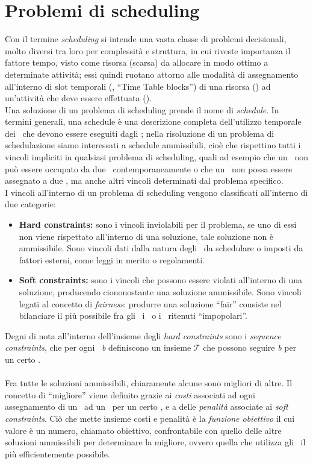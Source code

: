 \section{Problemi di scheduling}
Con il termine \textit{scheduling} si intende una vasta classe di problemi decisionali, molto diversi tra loro per
complessità e struttura, in cui riveste importanza il fattore
tempo, visto come risorsa (scarsa) da allocare in modo ottimo a determinate attività; essi quindi ruotano attorno alle modalità di assegnamento all'interno di slot temporali (\ttb, ``Time Table blocks'') di una risorsa (\task) ad un'attività che deve essere effettuata (\items). \\
Una soluzione di un problema di scheduling prende il nome di \textit{schedule}. In termini generali,
una schedule è una descrizione completa dell'utilizzo temporale dei \task\ che devono essere eseguiti dagli \items; nella risoluzione di un problema di schedulazione siamo interessati a schedule ammissibili, cioè che rispettino tutti i vincoli impliciti in qualsiasi problema di scheduling, quali ad esempio che un \task\ non può essere occupato da due \items\ contemporaneamente o che un \items\ non possa essere assegnato a due \task, ma anche altri vincoli determinati dal problema specifico. \\
I vincoli all'interno di un problema di scheduling vengono classificati all'interno di due categorie:
\begin{itemize}
    \item \textbf{Hard constraints:} sono i vincoli inviolabili per il problema, se uno di essi non viene rispettato all'interno di una soluzione, tale soluzione non è ammissibile. Sono vincoli dati dalla natura degli \items\ da schedulare o imposti da fattori esterni, come leggi in merito o regolamenti.
    \item \textbf{Soft constraints:} sono i vincoli che possono essere violati all'interno di una soluzione, producendo ciononostante una soluzione ammissibile. Sono vincoli legati al concetto di \textit{fairness}: produrre una soluzione ``fair'' consiste nel bilanciare il più possibile fra gli \items\ i \task\ o i \ttb\ ritenuti ``impopolari''.
\end{itemize}
Degni di nota all'interno dell'insieme degli \textit{hard constraints} sono i \textit{sequence constraints}, che per ogni \ttb\ \textit{b} definiscono un insieme $\mathcal{T}$ che possono seguire \textit{b} per un certo \items. \\ \\
\noindent
Fra tutte le soluzioni ammissibili, chiaramente alcune sono migliori di altre. Il concetto di ``migliore'' viene definito grazie ai \textit{costi} associati ad ogni assegnamento di un \items\ ad un \task\ per un certo \ttb, e a delle \textit{penalità} associate ai \textit{soft constraints}. Ciò che mette insieme costi e penalità è la \textit{funzione obiettivo} il cui valore è un numero, chiamato obiettivo, confrontabile con quello delle altre soluzioni ammissibili per determinare la migliore, ovvero quella che utilizza gli \items\ il più efficientemente possibile.
